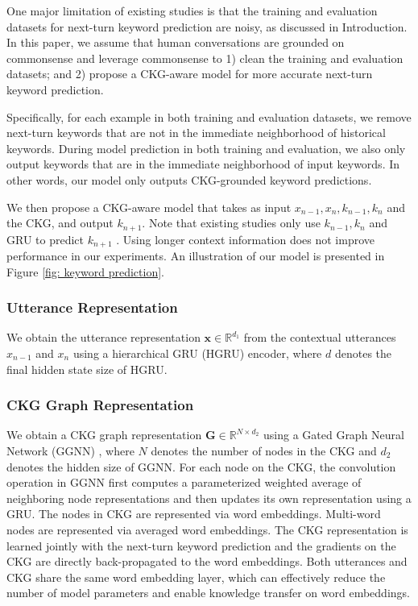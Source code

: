 \documentclass[letterpaper]{article} %
\begin{document}
One major limitation of existing studies is that the training and evaluation datasets for next-turn keyword prediction are noisy, as discussed in Introduction. In this paper, we assume that human conversations are grounded on commonsense and leverage commonsense to 1) clean the training and evaluation datasets; and 2) propose a CKG-aware model for more accurate next-turn keyword prediction.

Specifically, for each example in both training and evaluation datasets, we remove next-turn keywords that are not in the immediate neighborhood of historical keywords. During model prediction in both training and evaluation, we also only output keywords that are in the immediate neighborhood of input keywords. In other words, our model only outputs CKG-grounded keyword predictions.

We then propose a CKG-aware model that takes as input $x_{n-1}, x_{n}, k_{n-1}, k_{n}$ and the CKG, and output $k_{n+1}$. Note that existing studies only use $k_{n-1}, k_{n}$ and GRU \cite{cho2014learning} to predict $k_{n+1}$ \cite{tang2019target, qin2020dynamic}. Using longer context information does not improve performance in our experiments. An illustration of our model is presented in Figure \ref{fig: keyword prediction}.

\subsubsection{Utterance Representation}
We obtain the utterance representation $\mathbf{x} \in \mathbb{R}^{d_1}$ from the contextual utterances $x_{n-1}$ and $x_{n}$ using a hierarchical GRU (HGRU) encoder, where $d$ denotes the final hidden state size of HGRU.
\subsubsection{CKG Graph Representation}
We obtain a CKG graph representation $\mathbf{G} \in \mathbb{R}^{N\times d_2}$ using a Gated Graph Neural Network (GGNN) \cite{li2016gated}, where $N$ denotes the number of nodes in the CKG and $d_2$ denotes the hidden size of GGNN. For each node on the CKG, the convolution operation in GGNN first computes a parameterized weighted average of neighboring node representations and then updates its own representation using a GRU. The nodes in CKG are represented via word embeddings. Multi-word nodes are represented via averaged word embeddings. The CKG representation is learned jointly with the next-turn keyword prediction and the gradients on the CKG are directly back-propagated to the word embeddings. Both utterances and CKG share the same word embedding layer, which can effectively reduce the number of model parameters and enable knowledge transfer on word embeddings.
\end{document}
